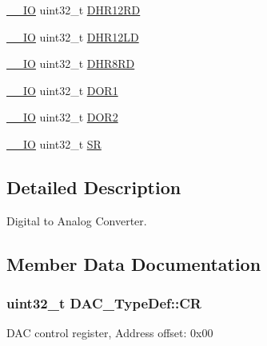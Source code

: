 \begin{DoxyCompactItemize}
\item 
\hyperlink{core__cm4_8h_aec43007d9998a0a0e01faede4133d6be}{\+\_\+\+\_\+\+IO} uint32\+\_\+t \hyperlink{struct_d_a_c___type_def_affa5cc9fe0cc9eb594d703bdc9d9abd9}{D\+H\+R12\+RD}
\item 
\hyperlink{core__cm4_8h_aec43007d9998a0a0e01faede4133d6be}{\+\_\+\+\_\+\+IO} uint32\+\_\+t \hyperlink{struct_d_a_c___type_def_aea4d055e3697999b44cdcf2702d79d40}{D\+H\+R12\+LD}
\item 
\hyperlink{core__cm4_8h_aec43007d9998a0a0e01faede4133d6be}{\+\_\+\+\_\+\+IO} uint32\+\_\+t \hyperlink{struct_d_a_c___type_def_a03f8d95bbf0ce3a53cb79506d5bf995a}{D\+H\+R8\+RD}
\item 
\hyperlink{core__cm4_8h_aec43007d9998a0a0e01faede4133d6be}{\+\_\+\+\_\+\+IO} uint32\+\_\+t \hyperlink{struct_d_a_c___type_def_a50b4f0b0d2a376f729c8d7acf47864c3}{D\+O\+R1}
\item 
\hyperlink{core__cm4_8h_aec43007d9998a0a0e01faede4133d6be}{\+\_\+\+\_\+\+IO} uint32\+\_\+t \hyperlink{struct_d_a_c___type_def_a1bde8391647d6422b39ab5ba4f13848b}{D\+O\+R2}
\item 
\hyperlink{core__cm4_8h_aec43007d9998a0a0e01faede4133d6be}{\+\_\+\+\_\+\+IO} uint32\+\_\+t \hyperlink{struct_d_a_c___type_def_a1d3fd83d6ed8b2d90b471db4509b0e70}{SR}
\end{DoxyCompactItemize}


\subsection{Detailed Description}
Digital to Analog Converter. 

\subsection{Member Data Documentation}
\subsubsection[{\texorpdfstring{CR}{CR}}]{ uint32\+\_\+t D\+A\+C\+\_\+\+Type\+Def\+::\+CR}\hypertarget{struct_d_a_c___type_def_a394324f0b573837ca15a87127b2a37ea}{}\label{struct_d_a_c___type_def_a394324f0b573837ca15a87127b2a37ea}
D\+AC control register, Address offset\+: 0x00 
